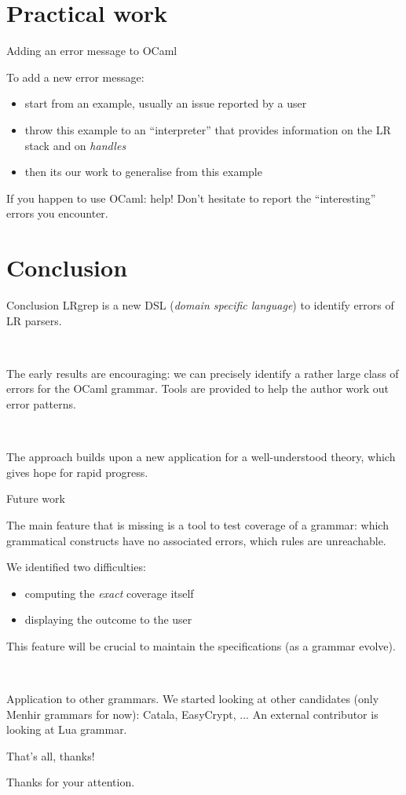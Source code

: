 \documentclass{beamer}          %
\begin{document}
\section{Practical work}

\begin{frame}{Adding an error message to OCaml}

  To add a new error message:
  \begin{itemize}
    \item start from an example, usually an issue reported by a user
    \item throw this example to an ``interpreter'' that provides information on the LR stack and on {\em handles}
    \item then its our work to generalise from this example
  \end{itemize}
  \pause
  \begin{block}{If you happen to use OCaml: help!}
    Don't hesitate to report the ``interesting'' errors you encounter.
  \end{block}
\end{frame}

\section{Conclusion}

\begin{frame}{Conclusion}
  LRgrep is a new DSL ({\em domain specific language}) to identify errors of LR parsers.

\

  The early results are encouraging: we can precisely identify a rather large class of errors for the OCaml grammar. Tools are provided to help the author work out error patterns.

\

  The approach builds upon a new application for a well-understood theory, which gives hope for rapid progress.

\end{frame}

\begin{frame}{Future work}

  The main feature that is missing is a tool to test coverage of a grammar:
  which grammatical constructs have no associated errors, which rules are unreachable.

  We identified two difficulties:
\begin{itemize}
  \item computing the {\em exact} coverage itself
  \item displaying the outcome to the user
\end{itemize}

This feature will be crucial to maintain the specifications (as a grammar evolve).

\

\pause
Application to other grammars. We started looking at other candidates (only Menhir grammars for now): Catala, EasyCrypt, ...
An external contributor is looking at Lua grammar.

\end{frame}

\begin{frame}{That's all, thanks!}

  Thanks for your attention.

\end{frame}
\end{document}
